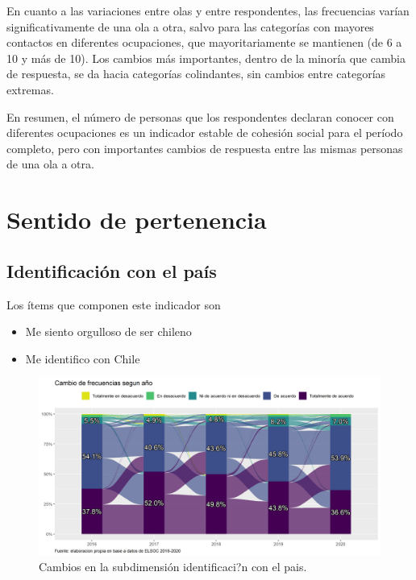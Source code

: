 \documentclass[
  12pt,
]{book}
\begin{document}
En cuanto a las variaciones entre olas y entre respondentes, las frecuencias varían significativamente de una ola a otra, salvo para las categorías con mayores contactos en diferentes ocupaciones, que mayoritariamente se mantienen (de 6 a 10 y más de 10). Los cambios más importantes, dentro de la minoría que cambia de respuesta, se da hacia categorías colindantes, sin cambios entre categorías extremas.

En resumen, el número de personas que los respondentes declaran conocer con diferentes ocupaciones es un indicador estable de cohesión social para el período completo, pero con importantes cambios de respuesta entre las mismas personas de una ola a otra.

\hypertarget{sentido-de-pertenencia-1}{%
\section{Sentido de pertenencia}\label{sentido-de-pertenencia-1}}

\hypertarget{identificaciuxf3n-con-el-pauxeds}{%
\subsection{Identificación con el país}\label{identificaciuxf3n-con-el-pauxeds}}

Los ítems que componen este indicador son

\begin{itemize}
\item
  Me siento orgulloso de ser chileno
\item
  Me identifico con Chile
\end{itemize}

\begin{figure}[H]

{\centering \includegraphics[width=1\linewidth,height=1\textheight]{output/graphs/alluvial_identificacion} 

}

\caption{Cambios en la subdimensión identificaci?n con el pais.}\label{fig:alluvial-identificacion}
\end{figure}
\end{document}
